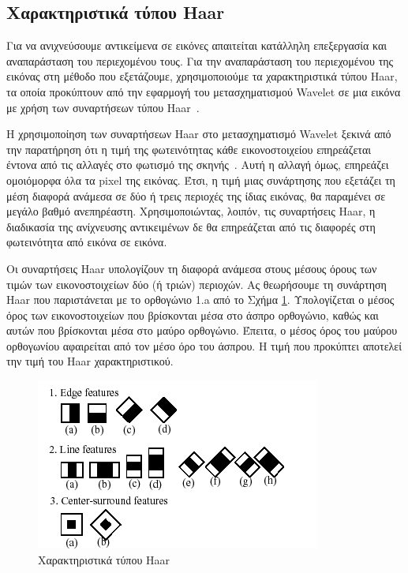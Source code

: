 \subsection{Χαρακτηριστικά τύπου Haar}

Για να ανιχνεύσουμε αντικείμενα σε εικόνες απαιτείται κατάλληλη επεξεργασία και
αναπαράσταση του περιεχομένου τους. Για την αναπαράσταση του περιεχομένου της εικόνας στη
μέθοδο που εξετάζουμε, χρησιμοποιούμε τα χαρακτηριστικά τύπου Haar, τα οποία προκύπτουν
από την εφαρμογή του μετασχηματισμού Wavelet σε μια εικόνα με χρήση των συναρτήσεων
τύπου Haar~\cite{Viola01rapidobject}.

Η χρησιμοποίηση των συναρτήσεων Haar στο μετασχηματισμό Wavelet ξεκινά από την
παρατήρηση ότι η τιμή της φωτεινότητας κάθε εικονοστοιχείου επηρεάζεται έντονα από τις
αλλαγές στο φωτισμό της σκηνής~\cite{OrePapSinOsu97}. Αυτή η αλλαγή όμως, επηρεάζει ομοιόμορφα
όλα τα pixel της εικόνας. Έτσι, η τιμή μιας συνάρτησης που εξετάζει τη μέση διαφορά
ανάμεσα σε δύο ή τρεις περιοχές της ίδιας εικόνας, θα παραμένει σε μεγάλο βαθμό ανεπηρέαστη.
Χρησιμοποιώντας, λοιπόν, τις συναρτήσεις Haar, η διαδικασία της ανίχνευσης αντικειμένων δε θα
επηρεάζεται από τις διαφορές στη φωτεινότητα από εικόνα σε εικόνα.

Οι συναρτήσεις Haar υπολογίζουν τη διαφορά ανάμεσα στους μέσους όρους των τιμών των
εικονοστοιχείων δύο (ή τριών) περιοχών. Ας θεωρήσουμε τη συνάρτηση Haar που παριστάνεται με
το ορθογώνιο 1.a από το Σχήμα \ref{fig:haarfeatures}. Υπολογίζεται ο μέσος όρος των εικονοστοιχείων που
βρίσκονται μέσα στο άσπρο ορθογώνιο, καθώς και αυτών που βρίσκονται μέσα στο μαύρο
ορθογώνιο. Έπειτα, ο μέσος όρος του μαύρου ορθογωνίου αφαιρείται από τον μέσο όρο του
άσπρου. Η τιμή που προκύπτει αποτελεί την τιμή του Haar χαρακτηριστικού.

\begin{figure}[htbp]
  \begin{center}
    \includegraphics[width=0.8\maxwidth]{../figures/haarfeatures.png}
    \caption{Χαρακτηριστικά τύπου Haar\label{fig:haarfeatures}}
   \end{center}
\end{figure}


